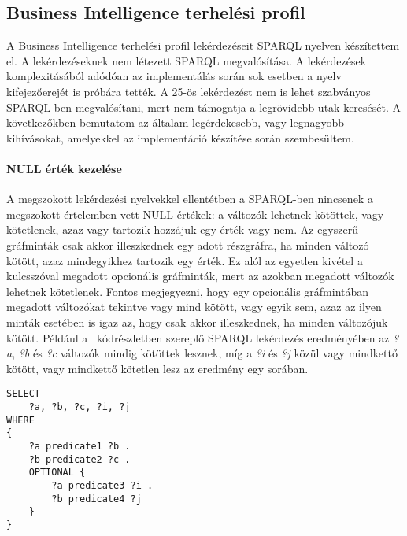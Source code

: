 \subsection{Business Intelligence terhelési profil}

A Business Intelligence terhelési profil lekérdezéseit SPARQL nyelven készítettem el. A lekérdezéseknek nem létezett SPARQL megvalósítása. A lekérdezések komplexitásából adódóan az implementálás során sok esetben a nyelv kifejezőerejét is próbára tették. A 25-ös lekérdezést nem is lehet szabványos SPARQL-ben megvalósítani, mert nem támogatja a legrövidebb utak keresését. A következőkben bemutatom az általam legérdekesebb, vagy legnagyobb kihívásokat, amelyekkel az implementáció készítése során szembesültem.

\paragraph{NULL érték kezelése}
A megszokott lekérdezési nyelvekkel ellentétben a SPARQL-ben nincsenek a megszokott értelemben vett NULL értékek: a változók lehetnek kötöttek, vagy kötetlenek, azaz vagy tartozik hozzájuk egy érték vagy nem. Az egyszerű gráfminták csak akkor illeszkednek egy adott részgráfra, ha minden változó kötött, azaz mindegyikhez tartozik egy érték. Ez alól az egyetlen kivétel a  kulcsszóval megadott opcionális gráfminták, mert az azokban megadott változók lehetnek kötetlenek. Fontos megjegyezni, hogy egy opcionális gráfmintában megadott változókat tekintve vagy mind kötött, vagy egyik sem, azaz az ilyen minták esetében is igaz az, hogy csak akkor illeszkednek, ha minden változójuk kötött. Például a ~kódrészletben szereplő SPARQL lekérdezés eredményében az \textit{?a}, \textit{?b} és \textit{?c} változók mindig kötöttek lesznek, míg a \textit{?i} és \textit{?j} közül vagy mindkettő kötött, vagy mindkettő kötetlen lesz az eredmény egy sorában.

\vspace{1.5ex}

\noindent\begin{minipage}{\textwidth}
\begin{lstlisting}[frame=single, morekeywords={SELECT},label=listing:sparql-null, caption=Példa az OPTIONAL kulcsszóra]
SELECT
	?a, ?b, ?c, ?i, ?j
WHERE
{
	?a predicate1 ?b .
	?b predicate2 ?c .
	OPTIONAL {
		?a predicate3 ?i .
		?b predicate4 ?j 
	}
}
\end{lstlisting}
\end{minipage}

